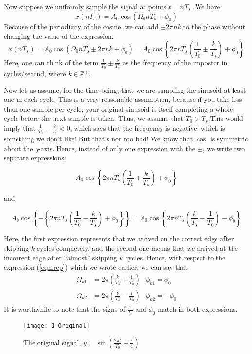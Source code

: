 Now suppose we uniformly sample the signal at points $t=nT_s$. We have:
\[x(nT_s)=A_0\cos(\Omega_0 n T_s +\phi_0)\]
Because of the periodicity of the cosine, we can add $\pm 2\pi n k$ to the phase without changing the value of the expression.
\[x(nT_s)=A_0\cos(\Omega_0 n T_s \pm 2\pi nk +\phi_0)
=A_0\cos\left\{2\pi n T_s \left(\frac{1}{T_0} \pm \frac{k}{T_s}\right) +\phi_0\right\}\]
Here, one can think of the term $\frac{1}{T_0}\pm\frac{k}{T_s}$ as the frequency of the impostor in cycles/second, where $k\in \mathbb{Z}^+$.

Now let us assume, for the time being, that we are sampling the sinusoid at least one in each cycle. This is a very reasonable assumption, because if you take less than one sample per cycle, your original sinusoid is itself completing a whole cycle before the next sample is taken. Thus, we assume that $T_0 > T_s$.This would imply that $\frac{1}{T_0}-\frac{k}{T_s}<0$, which says that the frequency is negative, which is something we don't like! But that's not too bad! We know that $\cos$ is symmetric about the $y$-axis. Hence, instead of only one expression with the $\pm$, we write two separate expressions:

\[A_0\cos\left\{2\pi n T_s \left(\frac{1}{T_0} + \frac{k}{T_s}\right) +\phi_0\right\}\]

\centerline{and}

\[A_0\cos\left\{-\left\{2\pi n T_s \left(\frac{1}{T_0} - \frac{k}{T_s}\right) +\phi_0\right\}\right\}=
A_0\cos\left\{2\pi n T_s \left(\frac{k}{T_s}-\frac{1}{T_0}\right) - \phi_0\right\}
\]

Here, the first expression represents that we arrived on the correct edge after skipping $k$ cycles completely, and the second one means that we arrived at the incorrect edge after ``almost'' skipping $k$ cycles. Hence, with respect to the expression (\ref{eqn:rep}) which we wrote earlier, we can say that
\begin{align}
\Omega_{k1}&=2\pi\left(\frac{k}{T_s} + \frac{1}{T_0}\right)  &\phi_{k1}=\phi_0\\
\Omega_{k2}&=2\pi\left(\frac{k}{T_s} - \frac{1}{T_0}\right) &\phi_{k2}=-\phi_0
\end{align}
It is worthwhile to note that the signs of $\frac{1}{T_0}$ and $\phi_0$ match in both expressions.

\begin{figure}[ht]
\texttt{[image: 1-Original]}
\caption{\label{fig:originalSignal}The original signal, $y=\sin\left(\frac{2\pi t}{T_0}+\frac{\pi}{4}\right)$}
\end{figure}

